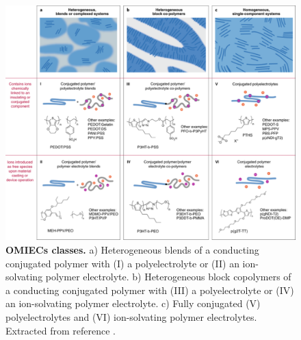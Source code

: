 \begin{figure}[ht]
  \centering
  \includegraphics[width=\textwidth]{Images/pdf/OMIEC_types.pdf}
  \caption[Material classes of OMIECs]{\textbf{OMIECs classes.} a) Heterogeneous blends of a conducting conjugated polymer with (I) %
  a polyelectrolyte or (II) an ion-solvating polymer electrolyte. %
  b) Heterogeneous block copolymers of a conducting conjugated polymer with (III) %
  a polyelectrolyte or (IV) an ion-solvating polymer electrolyte. %
  c) Fully conjugated (V) %
  polyelectrolytes and (VI) ion-solvating polymer electrolytes.%
  Extracted from reference \cite{paulsenOrganicMixedIonic2020}.}
  \label{fig:omiectypes}
\end{figure}



